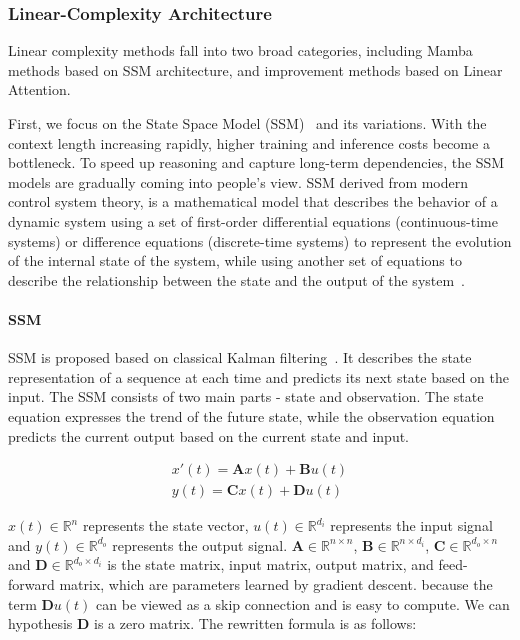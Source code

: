 \documentclass[11pt, a4paper, logo, copyright, nonumbering]{map}
\begin{document}
\subsubsection{Linear-Complexity Architecture}
\label{ssec:linear_comp_arch}

Linear complexity methods fall into two broad categories, including Mamba methods based on SSM architecture, and improvement methods based on Linear Attention. 


    

    

    

First, we focus on the State Space Model (SSM)~\cite{kalman1960new} and its variations. With the context length increasing rapidly, higher training and inference costs become a bottleneck. To speed up reasoning and capture long-term dependencies, the SSM models are gradually coming into people's view. SSM derived from modern control system theory, is a mathematical model that describes the behavior of a dynamic system using a set of first-order differential equations (continuous-time systems) or difference equations (discrete-time systems) to represent the evolution of the internal state of the system, while using another set of equations to describe the relationship between the state and the output of the system~\cite{voelker2018improving}.

\paragraph{SSM}
SSM is proposed based on classical Kalman filtering~\citet{Bang18, Gu2020HiPPORM}. It describes the state representation of a sequence at each time and predicts its next state based on the input. The SSM consists of two main parts - state and  observation. The state equation expresses the trend of the future state, while the observation equation predicts the current output based on the current state and input.

\begin{equation}
\begin{aligned}
x'(t)=\mathbf{A}x(t)+\mathbf{B}u(t) \\
y(t)=\mathbf{C}x(t) + \mathbf{D}u(t)
\label{eq:origin_ssm}
\end{aligned}
\end{equation}

$x(t) \in \mathbb{R}^{n}$ represents the state vector, $u(t) \in \mathbb{R}^{d_i}$ represents the input signal and $y(t) \in \mathbb{R}^{d_o}$ represents the output signal. $\mathbf{A} \in \mathbb{R}^{n \times n}$, $\mathbf{B} \in \mathbb{R}^{n \times d_i}$, $\mathbf{C} \in \mathbb{R}^{d_o \times n}$ and $\mathbf{D} \in \mathbb{R}^{d_o \times d_i}$ is the state matrix, input matrix, output matrix, and feed-forward matrix, which are parameters learned by gradient descent.  because the term $ \mathbf{D}u(t)$ can be viewed as a skip connection and is easy to compute. We can hypothesis $\mathbf{D}$ is a zero matrix. The rewritten formula is as follows:
\end{document}
